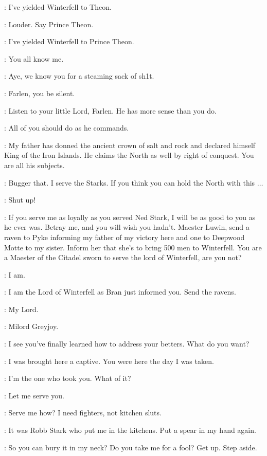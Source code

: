 \BRAN: I've yielded Winterfell to Theon. 

\THEON: Louder. Say Prince Theon. 

\BRAN: I've yielded Winterfell to Prince Theon. 

\THEON: You all know me. 

\FARLEN: Aye, we know you for a steaming sack of sh1t. 

\BRAN: Farlen, you be silent. 

\THEON: Listen to your little Lord, Farlen. He has more sense than you do. 

\BRAN: All of you should do as he commands. 

\THEON: My father has donned the ancient crown of salt and rock and declared himself King of the Iron Islands. He claims the North as well by right of conquest. You are all his subjects. 

\FARLEN: Bugger that. I serve the Starks. If you think you can hold the North with this $\ldots$

\DRENNAN: Shut up! 

\THEON: If you serve me as loyally as you served Ned Stark, I will be as good to you as he ever was. Betray me, and you will wish you hadn't. Maester Luwin, send a raven to Pyke informing my father of my victory here and one to Deepwood Motte to my sister. Inform her that she's to bring 500 men to Winterfell.  You are a Maester of the Citadel sworn to serve the lord of Winterfell, are you not? 

\LUWIN: I am. 

\THEON: I am the Lord of Winterfell as Bran just informed you. Send the ravens. 

\LUWIN: My Lord. 

\OSHA: Milord Greyjoy. 

\THEON: I see you've finally learned how to address your betters. What do you want? 

\OSHA: I was brought here a captive. You were here the day I was taken. 

\THEON: I'm the one who took you. What of it? 

\OSHA:  Let me serve you.

\THEON: Serve me how? I need fighters, not kitchen sluts. 

\OSHA: It was Robb Stark who put me in the kitchens. Put a spear in my hand again. 

\THEON: So you can bury it in my neck? Do you take me for a fool? Get up. Step aside. 

